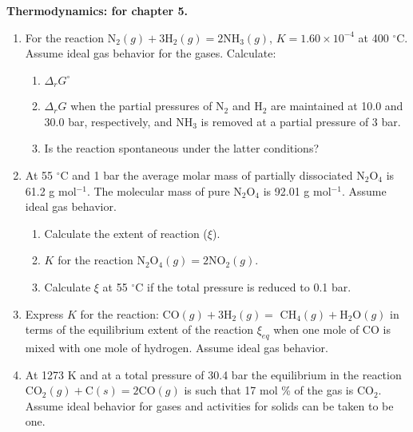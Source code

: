 \noindent
\textbf{Thermodynamics:
 for chapter 5.}\\

\begin{enumerate}

\item For the reaction N$_2(g) + 3$H$_2(g) = 2$NH$_3(g)$, $K = 1.60 \times 10^{-4}$ at 400 $^\circ$C. Assume ideal gas behavior for the gases. Calculate:

\begin{enumerate}
\item $\Delta_rG^\circ$
\item $\Delta_rG$ when the partial pressures of N$_2$ and H$_2$ are maintained at 10.0 and 30.0 bar, respectively, and NH$_3$ is removed at a partial pressure of 3 bar.
\item Is the reaction spontaneous under the latter conditions?
\end{enumerate}


\item At 55 $^\circ$C and 1 bar the average molar mass of partially dissociated N$_2$O$_4$ is 61.2 g mol$^{-1}$. The molecular mass of pure N$_2$O$_4$ is 92.01 g mol$^{-1}$. Assume ideal gas behavior.

\begin{enumerate}
\item Calculate the extent of reaction ($\xi$).
\item $K$ for the reaction N$_2$O$_4(g) = 2$NO$_2(g)$.
\item Calculate $\xi$ at 55 $^\circ$C if the total pressure is reduced to 0.1 bar.
\end{enumerate}


\item Express $K$ for the reaction: CO$(g) + 3$H$_2(g) =$ CH$_4(g) + $H$_2$O$(g)$ in terms of the equilibrium extent of the reaction $\xi_{eq}$ when one mole of CO is mixed with one mole of hydrogen. Assume ideal gas behavior.


\item At 1273 K and at a total pressure of 30.4 bar the equilibrium in the reaction CO$_2(g) + $C$(s) = 2$CO$(g)$ is such that 17 mol \% of the gas is CO$_2$. Assume ideal behavior for gases and activities for solids can be taken to be one.


\end{enumerate}
